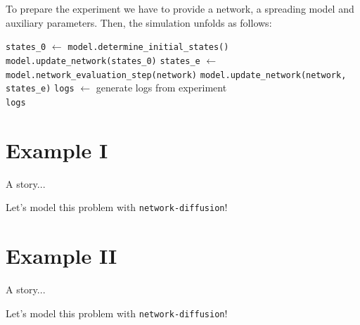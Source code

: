 \documentclass{beamer}
\begin{document}
\begin{frame}[fragile]{\secname}
    To prepare the experiment we have to provide a network, a spreading model and auxiliary parameters.
    Then, the simulation unfolds as follows:
    \begin{algorithmic}[1]
        \State \lstinline[style=py]{states_0} $\gets$ \lstinline[style=py]{model.determine_initial_states()}
        \State \lstinline[style=py]{model.update_network(states_0)} %
        \State \quad \quad \lstinline[style=py]{states_e} $\gets$ \lstinline[style=py]{model.network_evaluation_step(network)}
        \State \quad \quad \lstinline[style=py]{model.update_network(network, states_e)}
        \EndFor
        \State \lstinline[style=py]{logs} $\gets$ generate logs from experiment \\
        \Return \lstinline[style=py]{logs}
        \EndProcedure
    \end{algorithmic}
\end{frame}

\section{Example I}

\begin{frame}{\secname}
    A story...
\end{frame}

\begin{frame}{\secname}
    \begin{center}
        \large Let's model this problem with \lstinline[style=py]{network-diffusion}!
    \end{center}
\end{frame}

\section{Example II}

\begin{frame}{\secname}
    A story...
\end{frame}

\begin{frame}{\secname}
    \begin{center}
        \large Let's model this problem with \lstinline[style=py]{network-diffusion}!
    \end{center}
\end{frame}
\end{document}
